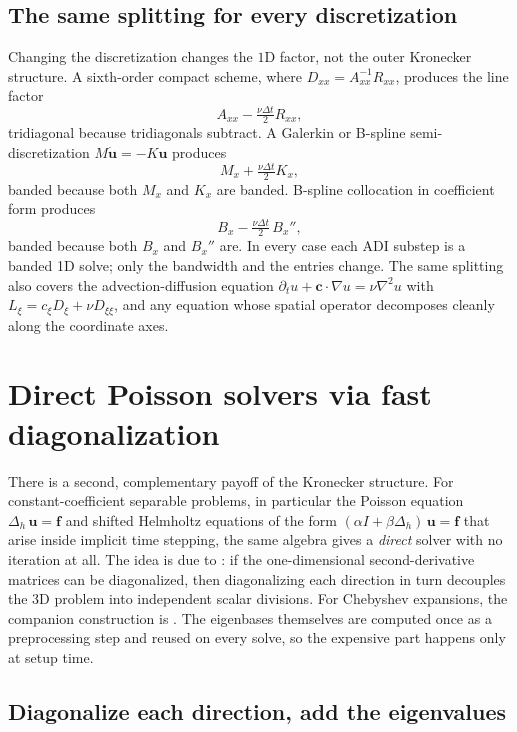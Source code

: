 \documentclass[11pt]{article}
\newcommand{\Dxx}{D_{xx}}
\newcommand{\Axx}{A_{xx}}
\newcommand{\Rxx}{R_{xx}}
\newcommand{\dt}{\Delta t}
\newcommand{\Lap}{\Delta_h}
\begin{document}
\subsection{The same splitting for every discretization}

Changing the discretization changes the $1$D factor, not the outer
Kronecker structure.  A sixth-order compact scheme, where
$\Dxx = \Axx^{-1}\Rxx$, produces the line factor
\[
  \Axx - \tfrac{\nu\dt}{2}\Rxx,
\]
tridiagonal because tridiagonals subtract.  A Galerkin or B-spline
semi-discretization $M\dot{\bm{u}} = -K\bm{u}$ produces
\[
  M_x + \tfrac{\nu\dt}{2} K_x,
\]
banded because both $M_x$ and $K_x$ are banded.  B-spline
collocation in coefficient form produces
\[
  B_x - \tfrac{\nu\dt}{2}\,B_x'',
\]
banded because both $B_x$ and $B_x''$ are.  In every case each ADI
substep is a banded 1D solve; only the bandwidth and the entries
change.  The same splitting also covers the
advection-diffusion equation
$\partial_t u + \bm{c}\cdot\nabla u = \nu\nabla^2 u$
with $L_\xi = c_\xi D_\xi + \nu D_{\xi\xi}$, and any equation whose
spatial operator decomposes cleanly along the coordinate axes.


\section{Direct Poisson solvers via fast diagonalization}
\label{sec:fast-diag}

There is a second, complementary payoff of the Kronecker structure.
For constant-coefficient separable problems, in particular the Poisson
equation $\Lap\,\bm{u} = \bm{f}$ and shifted Helmholtz equations of
the form $(\alpha I + \beta\Lap)\,\bm{u} = \bm{f}$ that arise inside
implicit time stepping, the same algebra gives a \emph{direct} solver
with no iteration at all.  The idea is due to
\citet{lynch1964direct}: if the one-dimensional second-derivative
matrices can be diagonalized, then diagonalizing each direction in
turn decouples the 3D problem into independent scalar divisions.  For
Chebyshev expansions, the companion construction is
\citet{haidvogel1979accurate}.  The eigenbases themselves are computed
once as a preprocessing step and reused on every solve, so the
expensive part happens only at setup time.

\subsection{Diagonalize each direction, add the eigenvalues}
\end{document}

